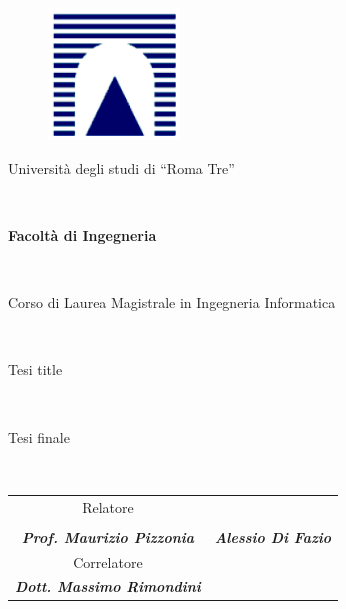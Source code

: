 \begin{figure}[!h]
	\centering
	\includegraphics[width=3.5cm]{images/logo_uni.png}
\end{figure}
\begin{center}
	\begin{Large}Università degli studi di ``Roma Tre''\end{Large}\\
	\vspace{0.5cm}
	\begin{Large}\textbf{Facoltà di Ingegneria}\end{Large}\\
	\vspace{0.5cm}
	\begin{Large}Corso di Laurea Magistrale in Ingegneria Informatica\end{Large}\\
	\vspace{2cm}
	\begin{huge}Tesi title\end{huge}\\
	\vspace{1.5cm}
	\begin{large}Tesi finale\end{large}\\
	\vspace{2.5cm}	
	\begin{tabular}{cc}
		\begin{minipage}{6.5cm}
			\centering
			Relatore
		\end{minipage}
		&
		\begin{minipage}{6.5cm}
			\centering
			Laureando\\
		\end{minipage}
		\\
		\begin{minipage}{6.5cm}
			\centering
			\vspace{0.4cm}
			\textbf{\textit{Prof. Maurizio Pizzonia}}
		\end{minipage}
		&
		\begin{minipage}{6.5cm}
			\centering
			\textbf{\textit{Alessio Di Fazio}}
		\end{minipage}
		\\
		\begin{minipage}{6.5cm}
			\centering
			\vspace{1cm}
			Correlatore
		\end{minipage}
		\\
		\begin{minipage}{6.5cm}
			\centering
			\vspace{0.4cm}
			\textbf{\textit{Dott. Massimo Rimondini}}
		\end{minipage}
	\end{tabular}


\end{center}
